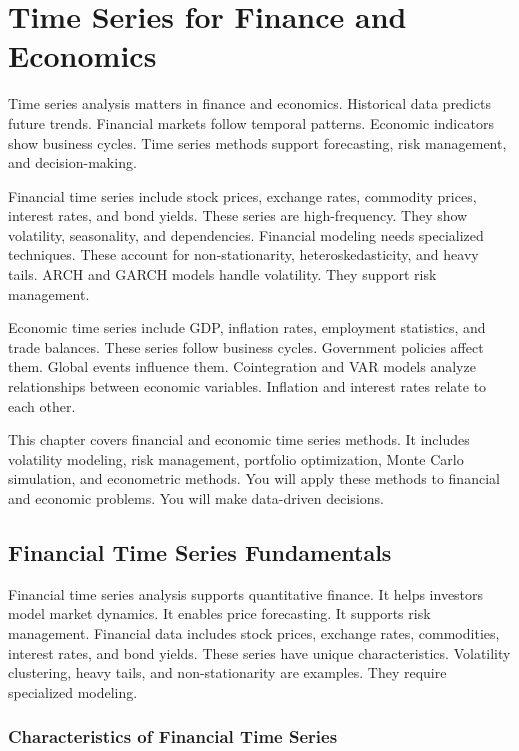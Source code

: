 \chapter{Time Series for Finance and Economics}

Time series analysis matters in finance and economics. Historical data predicts future trends. Financial markets follow temporal patterns. Economic indicators show business cycles. Time series methods support forecasting, risk management, and decision-making.

Financial time series include stock prices, exchange rates, commodity prices, interest rates, and bond yields. These series are high-frequency. They show volatility, seasonality, and dependencies. Financial modeling needs specialized techniques. These account for non-stationarity, heteroskedasticity, and heavy tails. ARCH and GARCH models handle volatility. They support risk management.

Economic time series include GDP, inflation rates, employment statistics, and trade balances. These series follow business cycles. Government policies affect them. Global events influence them. Cointegration and VAR models analyze relationships between economic variables. Inflation and interest rates relate to each other.

This chapter covers financial and economic time series methods. It includes volatility modeling, risk management, portfolio optimization, Monte Carlo simulation, and econometric methods. You will apply these methods to financial and economic problems. You will make data-driven decisions.

\section{Financial Time Series Fundamentals}

Financial time series analysis supports quantitative finance. It helps investors model market dynamics. It enables price forecasting. It supports risk management. Financial data includes stock prices, exchange rates, commodities, interest rates, and bond yields. These series have unique characteristics. Volatility clustering, heavy tails, and non-stationarity are examples. They require specialized modeling.

\subsection{Characteristics of Financial Time Series}

